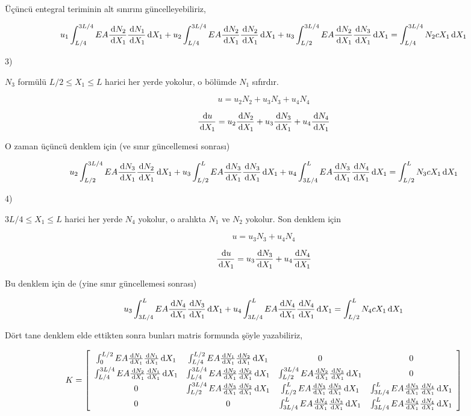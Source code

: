\documentclass[12pt,fleqn]{article}\usepackage{../../common}
\begin{document}
Üçüncü entegral teriminin alt sınırını güncelleyebiliriz,

$$
u_1 \int_{L/4}^{3L/4} EA \frac{\,\mathrm{d} N_2}{\,\mathrm{d} X_1} \frac{\,\mathrm{d} N_1}{\,\mathrm{d} X_1} \,\mathrm{d} X_1 +
u_2 \int_{L/4}^{3L/4} EA \frac{\,\mathrm{d} N_2}{\,\mathrm{d} X_1} \frac{\,\mathrm{d} N_2}{\,\mathrm{d} X_1} \,\mathrm{d} X_1  +
u_3 \int_{L/2}^{3L/4} EA \frac{\,\mathrm{d} N_2}{\,\mathrm{d} X_1} \frac{\,\mathrm{d} N_3}{\,\mathrm{d} X_1} \,\mathrm{d} X_1 =
\int_{L/4}^{3L/4} N_2 c X_1 \,\mathrm{d} X_1
$$

3)

$N_3$ formülü $L/2 \le X_1 \le L$ harici her yerde yokolur, o bölümde $N_1$
sıfırdır. 

$$
u = u_2 N_2 + u_3 N_3 + u_4 N_4
$$

$$
\frac{\,\mathrm{d} u}{\,\mathrm{d} X_1} =
u_2 \frac{\,\mathrm{d} N_2}{\,\mathrm{d} X_1} + 
u_3 \frac{\,\mathrm{d} N_3}{\,\mathrm{d} X_1} + 
u_4 \frac{\,\mathrm{d} N_4}{\,\mathrm{d} X_1} 
$$

O zaman üçüncü denklem için (ve sınır güncellemesi sonrası)

$$
u_2 \int_{L/2}^{3L/4} EA \frac{\,\mathrm{d} N_3}{\,\mathrm{d} X_1} \frac{\,\mathrm{d} N_2}{\,\mathrm{d} X_1} \,\mathrm{d} X_1  +
u_3 \int_{L/2}^{L} EA \frac{\,\mathrm{d} N_3}{\,\mathrm{d} X_1} \frac{\,\mathrm{d} N_3}{\,\mathrm{d} X_1} \,\mathrm{d} X_1  +
u_4 \int_{3L/4}^{L} EA \frac{\,\mathrm{d} N_3}{\,\mathrm{d} X_1} \frac{\,\mathrm{d} N_4}{\,\mathrm{d} X_1} \,\mathrm{d} X_1 =
\int_{L/2}^{L} N_3 c X_1 \,\mathrm{d} X_1
$$

4)

$3L/4 \le X_1 \le L$ harici her yerde $N_4$ yokolur, o aralıkta $N_1$ ve $N_2$
yokolur. Son denklem için

$$
u = u_3 N_3 + u_4 N_4
$$

$$
\frac{\,\mathrm{d} u}{\,\mathrm{d} X_1} =
u_3 \frac{\,\mathrm{d} N_3}{\,\mathrm{d} X_1} + 
u_4 \frac{\,\mathrm{d} N_4}{\,\mathrm{d} X_1} 
$$

Bu denklem için de (yine sınır güncellemesi sonrası)

$$
u_3 \int_{3L/4}^{L} EA \frac{\,\mathrm{d} N_4}{\,\mathrm{d} X_1} \frac{\,\mathrm{d} N_3}{\,\mathrm{d} X_1} \,\mathrm{d} X_1  +
u_4 \int_{3L/4}^{L} EA \frac{\,\mathrm{d} N_4}{\,\mathrm{d} X_1} \frac{\,\mathrm{d} N_4}{\,\mathrm{d} X_1} \,\mathrm{d} X_1  =
\int_{L/2}^{L} N_4 c X_1 \,\mathrm{d} X_1
$$

Dört tane denklem elde ettikten sonra bunları matris formunda şöyle yazabiliriz,

$$
\renewcommand*{\arraystretch}{1.5}
K = \left[\begin{array}{cccc}
  \int_{0}^{L/2} EA \frac{\ud N_1}{\ud X_1} \frac{\ud N_1}{\ud X_1} \ud X_1 &
  \int_{L/4}^{L/2} EA \frac{\ud N_1}{\ud X_1} \frac{\ud N_2}{\ud X_1} \ud X_1 &
  0 &
  0 \\
  \int_{L/4}^{3L/4} EA \frac{\ud N_2}{\ud X_1} \frac{\ud N_1}{\ud X_1} \ud X_1 &
  \int_{L/4}^{3L/4} EA \frac{\ud N_2}{\ud X_1} \frac{\ud N_2}{\ud X_1} \ud X_1 &
  \int_{L/2}^{3L/4} EA \frac{\ud N_2}{\ud X_1} \frac{\ud N_3}{\ud X_1} \ud X_1 &
  0 \\
  0 &
  \int_{L/2}^{3L/4} EA \frac{\ud N_3}{\ud X_1} \frac{\ud N_2}{\ud X_1} \ud X_1 &
  \int_{L/2}^{L} EA \frac{\ud N_3}{\ud X_1} \frac{\ud N_3}{\ud X_1} \ud X_1  &
  \int_{3L/4}^{L} EA \frac{\ud N_3}{\ud X_1} \frac{\ud N_4}{\ud X_1} \ud X_1 \\
  0 &
  0 &
  \int_{3L/4}^{L} EA \frac{\ud N_4}{\ud X_1} \frac{\ud N_3}{\ud X_1} \ud X_1 &
  \int_{3L/4}^{L} EA \frac{\ud N_4}{\ud X_1} \frac{\ud N_4}{\ud X_1} \ud X_1
\end{array}\right]
$$
\end{document}
